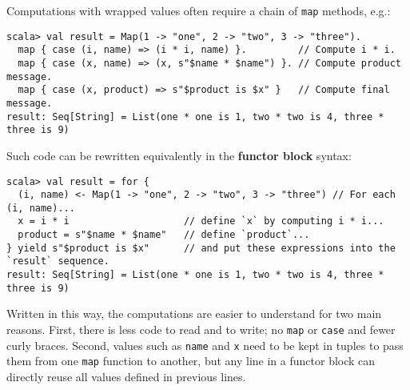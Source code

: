 Computations with wrapped values often require a chain of \lstinline!map!
methods, e.g.:
\begin{lstlisting}
scala> val result = Map(1 -> "one", 2 -> "two", 3 -> "three").
  map { case (i, name) => (i * i, name) }.         // Compute i * i.
  map { case (x, name) => (x, s"$name * $name") }. // Compute product message.
  map { case (x, product) => s"$product is $x" }   // Compute final message.
result: Seq[String] = List(one * one is 1, two * two is 4, three * three is 9)
\end{lstlisting}
Such code can be rewritten equivalently in the \textbf{functor
block} syntax:
\begin{lstlisting}
scala> val result = for {
  (i, name) <- Map(1 -> "one", 2 -> "two", 3 -> "three") // For each (i, name)...
  x = i * i                    // define `x` by computing i * i...
  product = s"$name * $name"   // define `product`...
} yield s"$product is $x"      // and put these expressions into the `result` sequence.
result: Seq[String] = List(one * one is 1, two * two is 4, three * three is 9) 
\end{lstlisting}
Written in this way, the computations are easier to understand for
two main reasons. First, there is less code to read and to write;
no \lstinline!map! or \lstinline!case! and fewer curly braces. Second,
values such as \lstinline!name! and \lstinline!x! need to be kept
in tuples to pass them from one \lstinline!map! function to another,
but any line in a functor block can directly reuse all values defined
in previous lines.

